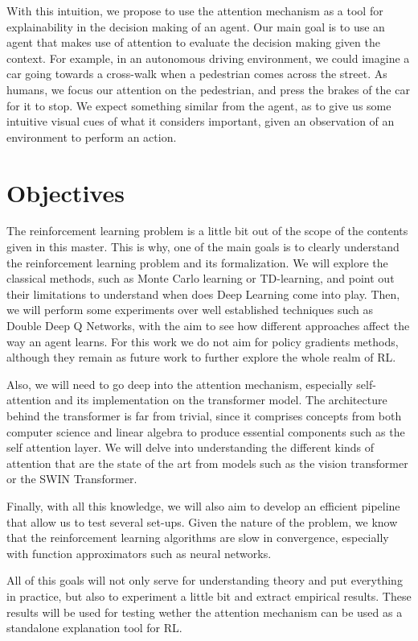  With this intuition, we propose to use the attention mechanism as a tool for explainability in the decision making of an agent. Our main goal is to use an agent that makes use of attention to evaluate the decision making given the context. For example, in an autonomous driving environment, we could imagine a car going towards a cross-walk when a pedestrian comes across the street. As humans, we focus our attention on the pedestrian, and press the brakes of the car for it to stop. We expect something similar from the agent, as to give us some intuitive visual cues of what it considers important, given an observation of an environment to perform an action.


\section{Objectives}
\label{sec:objectives}
The reinforcement learning problem is a little bit out of the scope of the contents given in this master. This is why, one of the main goals is to clearly understand the reinforcement learning problem and its formalization. We will explore the classical methods, such as Monte Carlo learning or TD-learning, and point out their limitations to understand when does Deep Learning come into play. Then, we will perform some experiments over well established techniques such as Double Deep Q Networks, with the aim to see how different approaches affect the way an agent learns. For this work we do not aim for policy gradients methods, although they remain as future work to further explore the whole realm of RL.

Also, we will need to go deep into the attention mechanism, especially self-attention and its implementation on the transformer model. The architecture behind the transformer is far from trivial, since it comprises concepts from both computer science and linear algebra to produce essential components such as the self attention layer. We will delve into understanding the different kinds of attention that are the state of the art from models such as the vision transformer or the SWIN Transformer.

Finally, with all this knowledge, we will also aim to develop an efficient pipeline that allow us to test several set-ups. Given the nature of the problem, we know that the reinforcement learning algorithms are slow in convergence, especially with function approximators such as neural networks. 

All of this goals will not only serve for understanding theory and put everything in practice, but also to experiment a little bit and extract empirical results. These results will be used for testing wether the attention mechanism can be used as a standalone explanation tool for RL.

